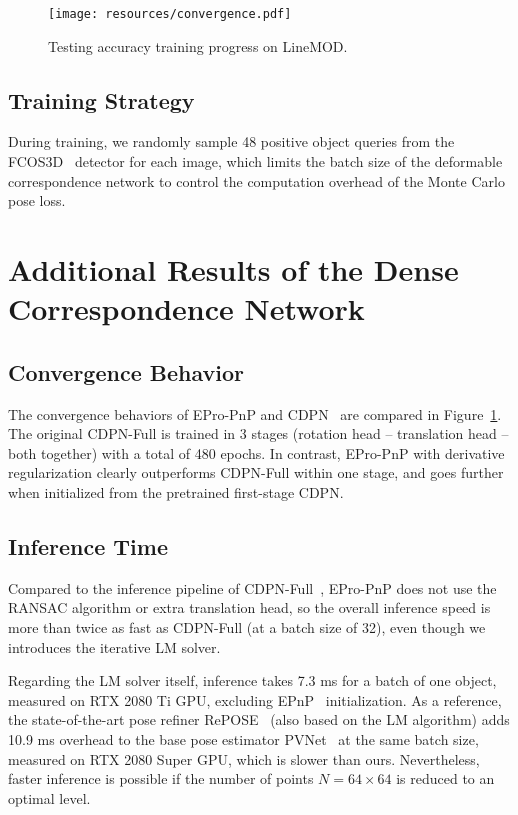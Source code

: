 \documentclass[10pt,twocolumn,letterpaper]{article}
\begin{document}
\begin{figure}[t]
\vspace{-0.5ex}
\begin{center}
    \texttt{[image: resources/convergence.pdf]}
\end{center}
\vspace{-1.2ex}
\caption{Testing accuracy \vs training progress on LineMOD.}
\label{fig:convergence}
\end{figure}

\subsection{Training Strategy}

During training, we randomly sample 48 positive object queries from the FCOS3D~\cite{fcos3d} detector for each image, which limits the batch size of the deformable correspondence network to control the computation overhead of the Monte Carlo pose loss.

\section{Additional Results of the Dense Correspondence Network}

\subsection{Convergence Behavior}

The convergence behaviors of EPro-PnP and CDPN~\cite{CDPN} are compared in Figure~\ref{fig:convergence}. The original CDPN-Full is trained in 3 stages (rotation head -- translation head -- both together) with a total of 480 epochs. In contrast, EPro-PnP with derivative regularization clearly outperforms CDPN-Full within one stage, and goes further when initialized from the pretrained first-stage CDPN.

\subsection{Inference Time}

Compared to the inference pipeline of CDPN-Full~\cite{CDPN}, EPro-PnP does not use the RANSAC algorithm or extra translation head, so the overall inference speed is more than twice as fast as CDPN-Full (at a batch size of 32), even though we introduces the iterative LM solver. 

Regarding the LM solver itself, inference takes 7.3 ms for a batch of one object, measured on RTX 2080 Ti GPU, excluding EPnP~\cite{EPnP} initialization.
As a reference, the state-of-the-art pose refiner RePOSE~\cite{repose} (also based on the LM algorithm) adds 10.9 ms overhead to the base pose estimator PVNet~\cite{pvnet} at the same batch size, measured on RTX 2080 Super GPU,
which is slower than ours.
Nevertheless, faster inference is possible if the number of points $N=64\times64$ is reduced to an optimal level.
\end{document}
